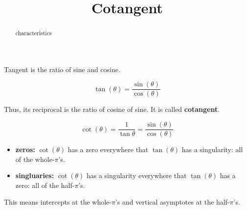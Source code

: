 \documentclass{ximera}
\title{Cotangent}
\begin{document}
\begin{abstract}
characteristics
\end{abstract}
\maketitle












Tangent is the ratio of sine and cosine. 

\[   \tan(\theta)  =  \frac{\sin(\theta)}{\cos(\theta)}  \]

Thus, its reciprocal is the ratio of cosine of sine.  It is called \textbf{cotangent}.


\[   \cot(\theta)  =  \frac{1}{\tan{\theta}}  =   \frac{\sin(\theta)}{\cos(\theta)}  \]




\begin{itemize}
\item \textbf{zeros:} $\cot(\theta)$ has a zero everywhere that $\tan(\theta)$ has a singularity:  all of the whole-$\pi$'s.
\item \textbf{singluaries:} $\cot(\theta)$ has a singularity everywhere that $\tan(\theta)$ has a zero:  all of the half-$\pi$'s.
\end{itemize}

This means intercepts at the whole-$\pi$'s and vertical asymptotes at the half-$\pi$'s.
\end{document}
